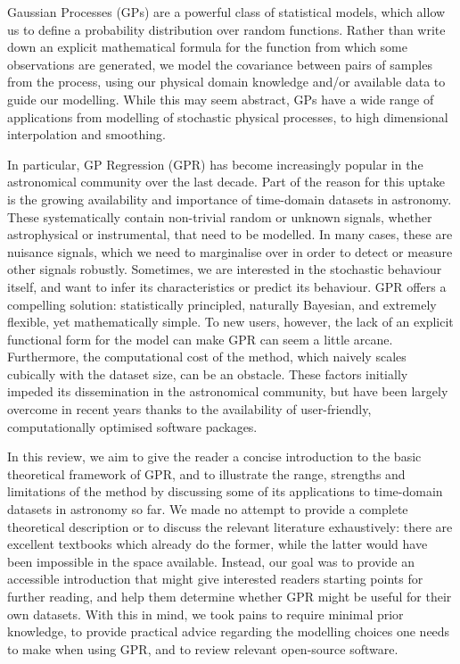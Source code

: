 \documentclass[letterpaper]{ar-1col}
\begin{document}
Gaussian Processes (GPs) are a powerful class of statistical models, which allow us to define a probability distribution over random functions. Rather than write down an explicit mathematical formula for the function from which some observations are generated, we model the covariance between pairs of samples from the process, using our physical domain knowledge and/or available data to guide our modelling.
While this may seem abstract, GPs have a wide range of applications from modelling of stochastic physical processes, to high dimensional interpolation and smoothing.
\begin{armarginnote}[]
\end{armarginnote}
In particular, GP Regression (GPR) has become increasingly popular in the astronomical community over the last decade. Part of the reason for this uptake is the growing availability and importance of time-domain datasets in astronomy. These systematically contain non-trivial random or unknown signals, whether astrophysical or instrumental, that need to be modelled. In many cases, these are nuisance signals, which we need to marginalise over in order to detect or measure other signals robustly. Sometimes, we are interested in the stochastic behaviour itself, and want to infer its characteristics or predict its behaviour. GPR offers a compelling solution: statistically principled, naturally Bayesian, and extremely flexible, yet mathematically simple. To new users, however, the lack of an explicit functional form for the model can make GPR can seem a little arcane. Furthermore, the computational cost of the method, which naively scales cubically with the dataset size, can be an obstacle. These factors initially impeded its dissemination in the astronomical community, but have been largely overcome in recent years thanks to the availability of user-friendly, computationally optimised software packages.

In this review, we aim to give the reader a concise introduction to the basic theoretical framework of GPR, and to illustrate the range, strengths and limitations of the method by discussing some of its applications to time-domain datasets in astronomy so far. We made no attempt to provide a complete theoretical description or to discuss the relevant literature exhaustively: there are excellent textbooks which already do the former, while the latter would have been impossible in the space available. Instead, our goal was to provide an accessible introduction that might give interested readers starting points for further reading, and help them determine whether GPR might be useful for their own datasets. With this in mind, we took pains to require minimal prior knowledge, to provide practical advice regarding the modelling choices one needs to make when using GPR, and to review relevant open-source software.
\end{document}
